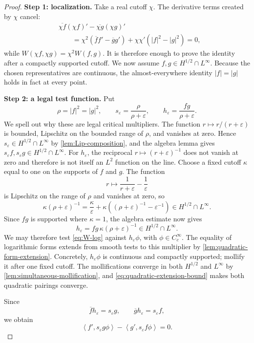 \documentclass[11pt,oneside]{book}
\theoremstyle{definition}
\theoremstyle{remark}
\newcommand{\1}{\mathbf 1}
\newcommand{\pair}[2]{\left\langle #1,#2\right\rangle}
\newcommand{\eps}{\varepsilon}
\begin{document}
\begin{proof}
\textbf{Step 1: localization.}
Take a real cutoff $\chi$.  The derivative terms created by $\chi$ cancel:
\begin{align*}
 &\overline{\chi f}(\chi f)'-\overline{\chi g}(\chi g)'\\
 &\qquad=\chi^2(\overline f f'-\overline g g')
          +\chi\chi'(|f|^2-|g|^2)=0,
\end{align*}
while
$W(\chi f,\chi g)=\chi^2W(f,g)$.  It is therefore enough to prove the
identity after a compactly supported cutoff.  We now assume
$f,g\in H^{1/2}\cap L^\infty$.  Because the chosen representatives are
continuous, the almost-everywhere identity $|f|=|g|$ holds in fact at every
point.

\textbf{Step 2: a legal test function.}
Put
\[
 \rho=|f|^2=|g|^2,
 \qquad s_\eps=\frac{\rho}{\rho+\eps},
 \qquad h_\eps=\frac{fg}{\rho+\eps}.
\]
We spell out why these are legal critical multipliers.  The function
$r\mapsto r/(r+\eps)$ is bounded, Lipschitz on the bounded range of
$\rho$, and vanishes at zero.  Hence
$s_\eps\in H^{1/2}\cap L^\infty$ by
\cref{lem:Lip-composition}, and the algebra lemma gives
$s_\eps f,s_\eps g\in H^{1/2}\cap L^\infty$.
For $h_\eps$, the reciprocal $r\mapsto(r+\eps)^{-1}$ does not vanish at
zero and therefore is not itself an $L^2$ function on the line.  Choose a
fixed cutoff $\kappa$ equal to one on the supports of $f$ and $g$.  The
function
\[
 r\longmapsto\frac1{r+\eps}-\frac1\eps
\]
is Lipschitz on the range of $\rho$ and vanishes at zero, so
\[
 \kappa(\rho+\eps)^{-1}
 =\frac{\kappa}{\eps}
  +\kappa\left((\rho+\eps)^{-1}-\eps^{-1}\right)
 \in H^{1/2}\cap L^\infty.
\]
Since $fg$ is supported where $\kappa=1$, the algebra estimate now gives
\[
 h_\eps=fg\,\kappa(\rho+\eps)^{-1}
 \in H^{1/2}\cap L^\infty.
\]
We may therefore test \eqref{eq:W-log} against $h_\eps\phi$, with
$\phi\in C_c^\infty$.  The equality of logarithmic forms extends from
smooth tests to this multiplier by
\cref{lem:quadratic-form-extension}.  Concretely, $h_\eps\phi$ is
continuous and compactly supported; mollify it after one fixed cutoff.  The
mollifications converge in both $H^{1/2}$ and $L^\infty$ by
\cref{lem:simultaneous-mollification}, and
\eqref{eq:quadratic-extension-bound} makes both quadratic pairings converge.

Since
\[
 \overline f h_\eps=s_\eps g,
 \qquad
 \overline g h_\eps=s_\eps f,
\]
we obtain
\begin{equation}
 \pair{f'}{s_\eps g\phi}-\pair{g'}{s_\eps f\phi}=0. \label{eq:s-eps-W}
\end{equation}


\end{proof}
\end{document}

